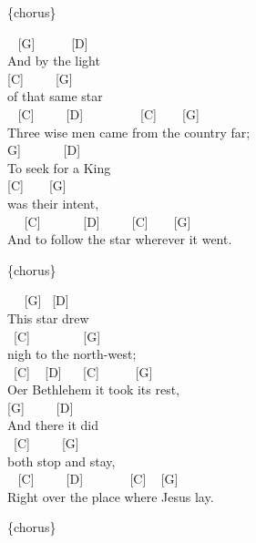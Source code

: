 \documentclass[
  letterpaper,
  twoside=false]{scrbook}
\begin{document}
\{chorus\}

~ {[}G{]} ~ ~ ~ {[}D{]}\\
And by the light\\
\hspace*{0.333em} {[}C{]} ~ ~ ~{[}G{]}\\
of that same star\\
\hspace*{0.333em} ~ {[}C{]} ~ ~ ~{[}D{]} ~ ~ ~ ~ ~ {[}C{]} ~ ~ {[}G{]}\\
Three wise men came from the country far;\\
\hspace*{0.333em}{[}G{]} ~ ~ ~ ~{[}D{]}\\
To seek for a King\\
\hspace*{0.333em} {[}C{]} ~ ~ {[}G{]}\\
was their intent,\\
\hspace*{0.333em} ~ ~{[}C{]} ~ ~ ~ ~{[}D{]} ~ ~ ~{[}C{]} ~ ~ {[}G{]}\\
And to follow the star wherever it went.

\{chorus\}

~ ~{[}G{]} ~{[}D{]}\\
This star drew\\
\hspace*{0.333em} ~{[}C{]} ~ ~ ~ ~ ~{[}G{]}\\
nigh to the north-west;\\
\hspace*{0.333em} ~{[}C{]} ~ {[}D{]} ~ ~{[}C{]} ~ ~ ~ {[}G{]}\\
O\textquotesingle er Bethlehem it took it\textquotesingle s rest,\\
\hspace*{0.333em} {[}G{]} ~ ~ ~{[}D{]}\\
And there it did\\
\hspace*{0.333em} ~{[}C{]} ~ ~ ~{[}G{]}\\
both stop and stay,\\
\hspace*{0.333em} ~ {[}C{]} ~ ~ ~{[}D{]} ~ ~ ~ ~ {[}C{]} ~ {[}G{]}\\
Right over the place where Jesus lay.

\{chorus\}
\end{document}
